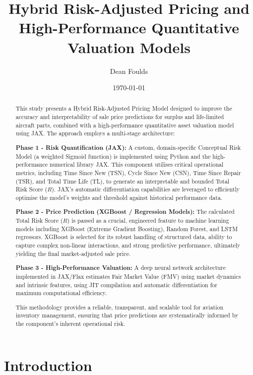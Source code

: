 \documentclass[12pt,a4paper]{article}
\title{Hybrid Risk-Adjusted Pricing and High-Performance Quantitative Valuation Models}
\author{Dean Foulds}
\date{\today}
\begin{document}
\maketitle
\thispagestyle{empty}

\begin{abstract}
This study presents a Hybrid Risk-Adjusted Pricing Model designed to improve the accuracy and interpretability of sale price predictions for surplus and life-limited aircraft parts, combined with a high-performance quantitative asset valuation model using JAX. The approach employs a multi-stage architecture:

\textbf{Phase 1 - Risk Quantification (JAX):} A custom, domain-specific Conceptual Risk Model (a weighted Sigmoid function) is implemented using Python and the high-performance numerical library JAX. This component utilises critical operational metrics, including Time Since New (TSN), Cycle Since New (CSN), Time Since Repair (TSR), and Total Time Life (TL), to generate an interpretable and bounded Total Risk Score ($R$). JAX's automatic differentiation capabilities are leveraged to efficiently optimise the model's weights and threshold against historical performance data.

\textbf{Phase 2 - Price Prediction (XGBoost / Regression Models):} The calculated Total Risk Score ($R$) is passed as a crucial, engineered feature to machine learning models including XGBoost (Extreme Gradient Boosting), Random Forest, and LSTM regressors. XGBoost is selected for its robust handling of structured data, ability to capture complex non-linear interactions, and strong predictive performance, ultimately yielding the final market-adjusted sale price.

\textbf{Phase 3 - High-Performance Valuation:} A deep neural network architecture implemented in JAX/Flax estimates Fair Market Value (FMV) using market dynamics and intrinsic features, using JIT compilation and automatic differentiation for maximum computational efficiency.

This methodology provides a reliable, transparent, and scalable tool for aviation inventory management, ensuring that price predictions are systematically informed by the component's inherent operational risk.
\end{abstract}

\tableofcontents
\newpage

\section{Introduction}
\end{document}
